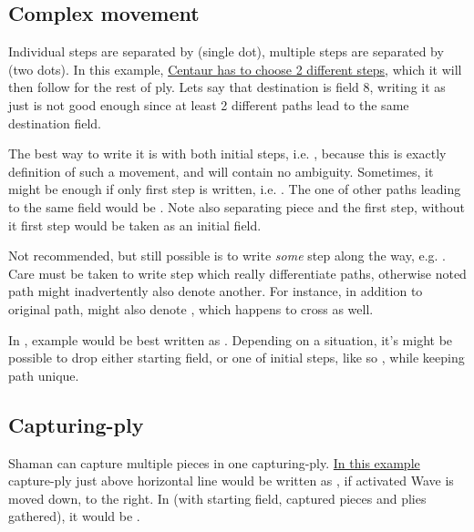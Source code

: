 \subsection*{Complex movement}
\label{sec:Appendix/Notation/Complex movement}

Individual steps are separated by  (single dot), multiple steps are separated by
 (two dots). In this example,
\hyperref[fig:scn_hd_05_centaur_multi_step]{Centaur has to choose 2 different steps},
which it will then follow for the rest of ply. Lets say that destination is field 8,
writing it as just  is not good enough since at least 2 different paths lead
to the same destination field.

The best way to write it is with both initial steps, i.e. , because
this is exactly definition of such a movement, and will contain no ambiguity. Sometimes,
it might be enough if only first step is written, i.e. . The one of other
paths leading to the same  field would be . Note also 
separating piece and the first step, without it first step would be taken as an initial
field.

Not recommended, but still possible is to write \emph{some} step along the way, e.g.
. Care must be taken to write step which really differentiate paths,
otherwise noted path might inadvertently also denote another. For instance, in addition
to original path,  might also denote , which happens
to cross  as well.

In , example would be best written as . Depending on a
situation, it's might be possible to drop either starting field, or one of initial steps,
like so , while keeping path unique.

\subsection*{Capturing-ply}
\label{sec:Appendix/Notation/Capturing-ply}

Shaman can capture multiple pieces in one capturing-ply.
\hyperref[fig:scn_cot_004_light_shaman_capture_ply]{In this example} capture-ply just above
horizontal line would be written as , if activated
Wave is moved down, to the right. In  (with starting field, captured pieces and
plies gathered), it would be \alg{[Hd9.h10*P.l11*P.p12]\textasciitilde{}[Wp12-n8]}.

